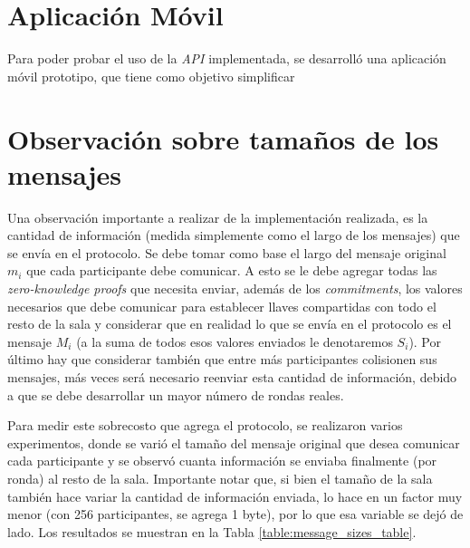 \section{Aplicación Móvil}

Para poder probar el uso de la \emph{API} implementada, se desarrolló una aplicación móvil prototipo, que tiene como objetivo simplificar 

\section{Observación sobre tamaños de los mensajes}

Una observación importante a realizar de la implementación realizada, es la cantidad de información (medida simplemente como el largo de los mensajes) que se envía en el protocolo. Se debe tomar como base el largo del mensaje original $m_i$ que cada participante debe comunicar. A esto se le debe agregar todas las \emph{zero-knowledge proofs} que necesita enviar, además de los \emph{commitments}, los valores necesarios que debe comunicar para establecer llaves compartidas con todo el resto de la sala y considerar que en realidad lo que se envía en el protocolo es el mensaje $M_i$ (a la suma de todos esos valores enviados le denotaremos $S_i$). Por último hay que considerar también que entre más participantes colisionen sus mensajes, más veces será necesario reenviar esta cantidad de información, debido a que se debe desarrollar un mayor número de rondas reales.

Para medir este sobrecosto que agrega el protocolo, se realizaron varios experimentos, donde se varió el tamaño del mensaje original que desea comunicar cada participante y se observó cuanta información se enviaba finalmente (por ronda) al resto de la sala. Importante notar que, si bien el tamaño de la sala también hace variar la cantidad de información enviada, lo hace en un factor muy menor (con 256 participantes, se agrega 1 byte), por lo que esa variable se dejó de lado. Los resultados se muestran en la Tabla \ref{table:message_sizes_table}.

